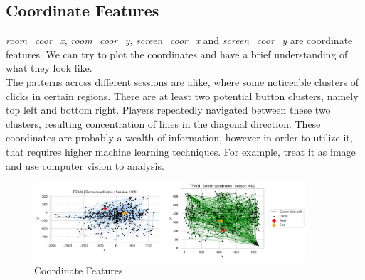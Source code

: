 \documentclass[11pt,a4paper]{article}
\begin{document}
    \subsection{Coordinate Features}
    \textit{room\_coor\_x}, \textit{room\_coor\_y}, \textit{screen\_coor\_x} and \textit{screen\_coor\_y} are coordinate features. We can try to plot the coordinates and have a brief understanding of what they look like. \\
    The patterns across different sessions are alike, where some noticeable clusters of clicks in certain regions. There are at least two potential button clusters, namely top left and bottom right. Players repeatedly navigated between these two clusters, resulting concentration of lines in the diagonal direction. These coordinates are probably a wealth of information, however in order to utilize it, that requires higher machine learning techniques. For example, treat it as image and use computer vision to analysis.
    \begin{figure}[H]
        \centering
        \includegraphics[width = 0.9\textwidth]{EDA_plot/corrdinates_1000.pdf}
        \caption{Coordinate Features}
        \label{fig:coordinate}
    \end{figure}
\end{document}
